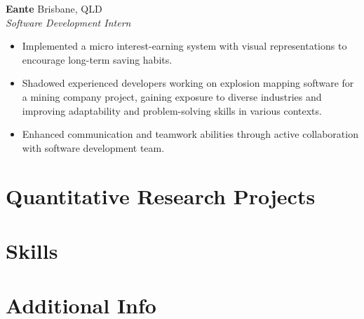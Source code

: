\documentclass[12pt]{article}
\begin{document}
\textbf{Eante} \hfill {Brisbane, QLD} \\
\indent \textit{\color{subtextgray}Software Development Intern}
\begin{itemize}[noitemsep, topsep=0em, left=0.8em]
  \item Implemented a micro interest-earning system with visual representations to encourage long-term saving habits.
  \item	Shadowed experienced developers working on explosion mapping software for a mining company project, gaining exposure to diverse industries and improving adaptability and problem-solving skills in various contexts.
  \item Enhanced communication and teamwork abilities through active collaboration with software development team.
\end{itemize}

\vspace{0.20em}

\section{Quantitative Research Projects}

\section{Skills}

\section{Additional Info}
\end{document}
